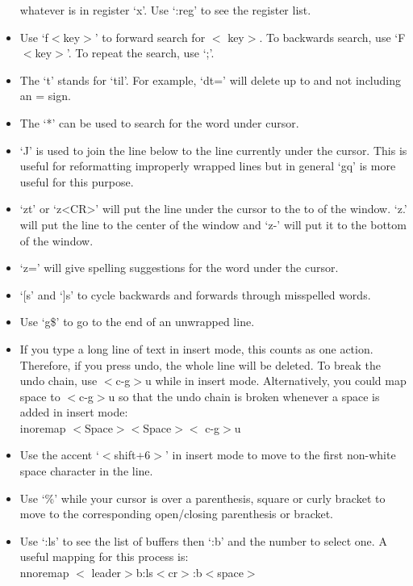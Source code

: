 \documentclass[10pt]{article}
\newcommand{\tlangle}{$<$}
\newcommand{\trangle}{$>$}
\begin{document}
\begin{itemize}
        whatever is in register `x'.  Use `:reg' to see the register list.
    \item Use `f\tlangle key\trangle' to forward search for \tlangle
        key\trangle. To backwards search, use `F\tlangle key\trangle'. To repeat
        the search, use `;'. 
    \item The `t' stands for `til'. For example, `dt=' will delete up to and not
        including an = sign.  \item The `*' can be used to search for the word
        under cursor.
    \item `J' is used to join the line below to the line currently under the
        cursor. This is useful for reformatting improperly wrapped lines but in
        general `gq' is more useful for this purpose.
    \item `zt' or `z<CR>' will put the line under the cursor to the to of the
        window. `z.' will put the line to the center of the window and `z-' will
        put it to the bottom of the window.
    \item `z=' will give spelling suggestions for the word under the cursor.
    \item `[s' and `]s' to cycle backwards and forwards through misspelled words.
    \item Use `g\$' to go to the end of an unwrapped line.
    \item If you type a long line of text in insert mode, this counts as one
        action. Therefore, if you press undo, the whole line will be deleted. To
        break the undo chain, use \tlangle c-g\trangle u while in insert mode.
        Alternatively, you could map space to \tlangle c-g\trangle u so that the
        undo chain is broken whenever a space is added in insert mode:\\
        inoremap \tlangle Space\trangle \tlangle Space\trangle \tlangle
        c-g\trangle u
    \item Use the accent `\tlangle shift+6\trangle' in insert mode to move to
        the first non-white space character in the line.
    \item Use `\%' while your cursor is over a parenthesis, square or curly
        bracket to move to the corresponding open/closing parenthesis or
        bracket.
    \item Use `:ls' to see the list of buffers then `:b' and the number to
        select one. A useful mapping for this process is:\\ nnoremap \tlangle
        leader\trangle b:ls\tlangle cr\trangle:b\tlangle space\trangle
\end{itemize}
\end{document}
